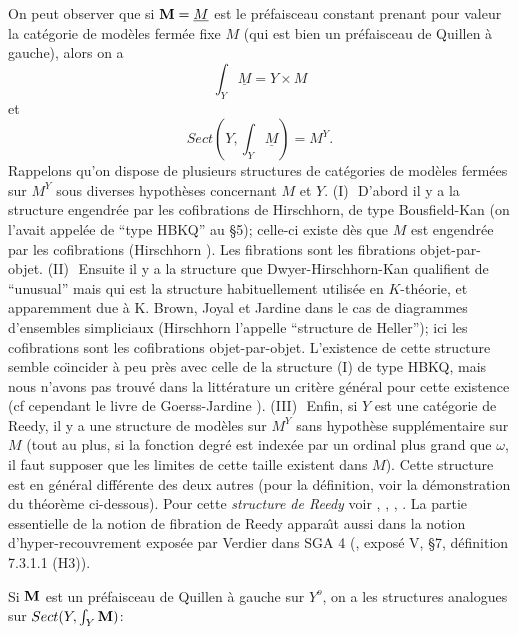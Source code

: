 \documentclass[12pt]{article}
\newcommand{\mm}{{\bf M}}
\begin{document}
On peut observer que si $\mm = \underline{M}$ est le pr\'efaisceau
constant
prenant pour
valeur la cat\'egorie de mod\`eles ferm\'ee fixe $M$ (qui est bien un
pr\'efaisceau de Quillen \`a
gauche), alors on a
$$
\int _Y\underline{M} = Y\times M
$$
et
$$
Sect (Y,\int _Y\underline{M}) = M^Y.
$$
Rappelons qu'on dispose de plusieurs structures de
cat\'egories de mod\`eles ferm\'ees
sur $M^Y$
sous diverses hypoth\`eses concernant $M$ et $Y$.
\newline
(I)\,\, D'abord il y  a la  structure engendr\'ee par les
cofibrations de Hirschhorn, de type Bousfield-Kan (on l'avait appel\'ee de
``type HBKQ'' au \S 5);
celle-ci existe d\`es que $M$ est
engendr\'ee par les cofibrations (Hirschhorn \cite{Hirschhorn}). Les
fibrations sont
les fibrations objet-par-objet.
\newline
(II)\,\, Ensuite il y a la structure que Dwyer-Hirschhorn-Kan qualifient
de ``unusual'' mais qui est la structure habituellement utilis\'ee en
$K$-th\'eorie, et apparemment due \`a K. Brown, Joyal et Jardine dans le cas de
diagrammes d'ensembles simpliciaux (Hirschhorn l'appelle
``structure de
Heller''); ici les cofibrations sont les cofibrations objet-par-objet.
L'existence de cette structure semble co\"{\i}ncider \`a peu pr\`es avec celle
de la structure (I) de type HBKQ, mais nous n'avons pas trouv\'e
dans la litt\'erature un crit\`ere g\'en\'eral pour cette existence (cf
cependant le livre de
Goerss-Jardine \cite{JardineGoerssBook}).
\newline
(III)\,\, Enfin, si $Y$ est une cat\'egorie de Reedy, il y a une structure
de mod\`eles sur $M^Y$ sans hypoth\`ese suppl\'ementaire sur $M$ (tout
au plus, si la fonction
degr\'e est index\'ee par un ordinal plus grand que $\omega$, il faut
supposer que  les limites de cette taille existent dans $M$). Cette structure
est en g\'en\'eral diff\'erente des deux autres (pour la d\'efinition,
voir la d\'emonstration du th\'eor\`eme ci-dessous). Pour cette {\em structure
de Reedy} voir \cite{Reedy}, \cite{Hirschhorn}, \cite{DHK},
\cite{JardineGoerssBook}. La partie essentielle de la notion de fibration
de Reedy appara\^{\i}t aussi
dans la notion d'hyper-recouvrement expos\'ee par Verdier dans SGA 4
(\cite{SGA4b}, expos\'e V, \S 7, d\'efinition 7.3.1.1 (H3)).

Si $\mm$ est un pr\'efaisceau de Quillen \`a gauche sur $Y^o$,
on a les structures analogues sur $Sect (Y,\int _Y\mm )$:
\end{document}
